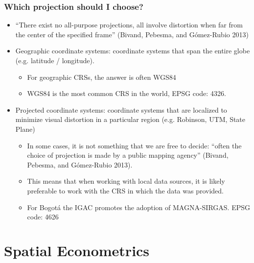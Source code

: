 \documentclass[
  shownotes,
  xcolor={svgnames},
  hyperref={colorlinks,citecolor=DarkBlue,linkcolor=DarkRed,urlcolor=DarkBlue}
   , aspectratio=169]{beamer}
\begin{document}
\begin{frame}[fragile]
\frametitle{Which projection should I choose?}

\begin{itemize}
\small
\item “There exist no all-purpose projections, all involve distortion when far from the center of the specified frame” (Bivand, Pebesma, and Gómez-Rubio 2013)
\medskip
   \item  Geographic coordinate systems: coordinate systems that span the entire globe (e.g. latitude / longitude).
   \begin{itemize}
   	\footnotesize
    \item For geographic CRSs, the answer is often WGS84
    \item WGS84 is the most common CRS in the world,  EPSG code: 4326. 
   \end{itemize}
   \medskip
   \item  Projected coordinate systems: coordinate systems that are localized to minimize visual distortion in a particular region (e.g. Robinson, UTM, State Plane)
\begin{itemize}
	\footnotesize
    \item In some cases, it is not something that we are free to decide: “often the choice of projection is made by a public mapping agency” (Bivand, Pebesma, and Gómez-Rubio 2013).
    \item  This means that when working with local data sources, it is likely preferable to work with the CRS in which the data was provided.
    \item For Bogotá the IGAC promotes the adoption of MAGNA-SIRGAS. EPSG code: 4626
    \end{itemize}




\end{itemize}
\end{frame}
\section{Spatial Econometrics}
\end{document}
